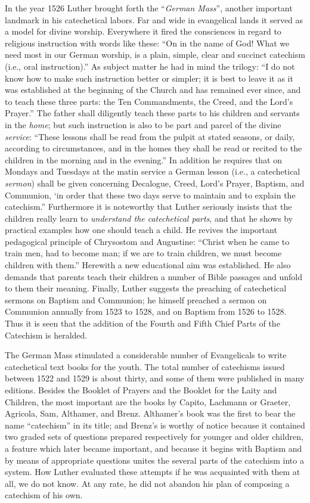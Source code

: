 In the year 1526 Luther brought forth the “\emph{German Mass}”, another important landmark in his catechetical labors. Far and wide in evangelical lands it served as a model for divine worship. Everywhere it fired the consciences in regard to religious instruction with words like these: “On in the name of God! What we need most in our German worship, is a plain, simple, clear and succinct catechism (i.e., oral instruction).” As subject matter he had in mind the trilogy: “I do not know how to make such instruction better or simpler; it is best to leave it as it was established at the beginning of the Church and has remained ever since, and to teach these three parts: the Ten Commandments, the Creed, and the Lord’s Prayer.” The father shall diligently teach these parts to his children and servants in the \emph{home}; but such instruction is also to be part and parcel of the divine \emph{service}: “These lessons shall be read from the pulpit at stated seasons, or daily, according to circumstances, and in the homes they shall be read or recited to the children in the morning and in the evening.” In addition he requires that on Mondays and Tuesdays at the matin service a German lesson (i.e., a catechetical \emph{sermon}) shall be given concerning Decalogue, Creed, Lord’s Prayer, Baptism, and Communion,
‘in order that these two days serve to maintain and to explain the catechism.” Furthermore it is noteworthy that Luther seriously insists that the children really learn to \emph{understand the catechetical parts}, and that he shows by practical examples how one should teach a child. He revives the important pedagogical principle of Chrysostom and Augustine: “Christ when he came to train men, had to become man; if we are to train children, we must become children with them.” Herewith a new educational aim was established. He also demands that parents teach their children a number of Bible passages and unfold to them their meaning. Finally, Luther suggests the preaching of catechetical sermons on Baptism and Communion; he himself preached a sermon on Communion annually from 1523 to 1528, and on Baptism from 1526 to 1528. Thus it is seen that the addition of the Fourth and Fifth Chief Parts of the Catechism is heralded.

The German Mass stimulated a considerable number of Evangelicals to write catechetical text books for the youth. The total number of catechisms issued between 1522 and 1529 is about thirty, and some of them were published in many editions. Besides the Booklet of Prayers and the Booklet for the Laity and Children, the most important are the books by Capito, Lachmann or Graeter, Agricola, Sam, Althamer, and Brenz. Althamer’s book was the first to bear the name “catechism” in its title; and Brenz’s is worthy of notice because it contained two graded sets of questions prepared respectively for younger and older children, a feature which later became important, and because it begins with Baptism and by means of appropriate questions unites the several parts of the catechism into a system. How Luther evaluated these attempts if he was acquainted with them at all, we do not know. At any rate, he did not abandon his plan of composing a catechism of his own.

